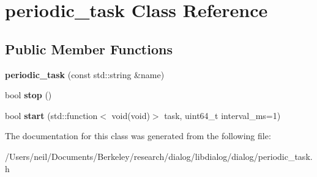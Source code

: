 \hypertarget{classperiodic__task}{}\section{periodic\+\_\+task Class Reference}
\label{classperiodic__task}
\subsection*{Public Member Functions}
\begin{DoxyCompactItemize}
\item 
\mbox{\label{classperiodic__task_a9290dc74dd438153930c1fa806fc9f43}} 
{\bfseries periodic\+\_\+task} (const std\+::string \&name)
\item 
\mbox{\label{classperiodic__task_a3e9de732bfaf096cb4f83a8813958f5a}} 
bool {\bfseries stop} ()
\item 
\mbox{\label{classperiodic__task_a17829d0796787612e33a912f7f1188af}} 
bool {\bfseries start} (std\+::function$<$ void(void)$>$ task, uint64\+\_\+t interval\+\_\+ms=1)
\end{DoxyCompactItemize}


The documentation for this class was generated from the following file\+:\begin{DoxyCompactItemize}
\item 
/\+Users/neil/\+Documents/\+Berkeley/research/dialog/libdialog/dialog/periodic\+\_\+task.\+h\end{DoxyCompactItemize}
